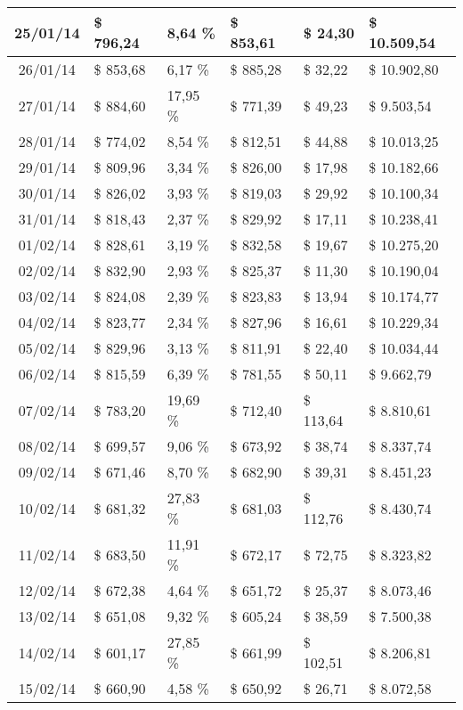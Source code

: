 \begin{small}
\begin{longtable}{|c|l|l|l|l|l|}
25/01/14 & \$ 796,24 & 8,64 \% & \$ 853,61 & \$ 24,30 & \$ 10.509,54 \\ \hline
26/01/14 & \$ 853,68 & 6,17 \% & \$ 885,28 & \$ 32,22 & \$ 10.902,80 \\ \hline
27/01/14 & \$ 884,60 & 17,95 \% & \$ 771,39 & \$ 49,23 & \$ 9.503,54 \\ \hline
28/01/14 & \$ 774,02 & 8,54 \% & \$ 812,51 & \$ 44,88 & \$ 10.013,25 \\ \hline
29/01/14 & \$ 809,96 & 3,34 \% & \$ 826,00 & \$ 17,98 & \$ 10.182,66 \\ \hline
30/01/14 & \$ 826,02 & 3,93 \% & \$ 819,03 & \$ 29,92 & \$ 10.100,34 \\ \hline
31/01/14 & \$ 818,43 & 2,37 \% & \$ 829,92 & \$ 17,11 & \$ 10.238,41 \\ \hline
01/02/14 & \$ 828,61 & 3,19 \% & \$ 832,58 & \$ 19,67 & \$ 10.275,20 \\ \hline
02/02/14 & \$ 832,90 & 2,93 \% & \$ 825,37 & \$ 11,30 & \$ 10.190,04 \\ \hline
03/02/14 & \$ 824,08 & 2,39 \% & \$ 823,83 & \$ 13,94 & \$ 10.174,77 \\ \hline
04/02/14 & \$ 823,77 & 2,34 \% & \$ 827,96 & \$ 16,61 & \$ 10.229,34 \\ \hline
05/02/14 & \$ 829,96 & 3,13 \% & \$ 811,91 & \$ 22,40 & \$ 10.034,44 \\ \hline
06/02/14 & \$ 815,59 & 6,39 \% & \$ 781,55 & \$ 50,11 & \$ 9.662,79 \\ \hline
07/02/14 & \$ 783,20 & 19,69 \% & \$ 712,40 & \$ 113,64 & \$ 8.810,61 \\ \hline
08/02/14 & \$ 699,57 & 9,06 \% & \$ 673,92 & \$ 38,74 & \$ 8.337,74 \\ \hline
09/02/14 & \$ 671,46 & 8,70 \% & \$ 682,90 & \$ 39,31 & \$ 8.451,23 \\ \hline
10/02/14 & \$ 681,32 & 27,83 \% & \$ 681,03 & \$ 112,76 & \$ 8.430,74 \\ \hline
11/02/14 & \$ 683,50 & 11,91 \% & \$ 672,17 & \$ 72,75 & \$ 8.323,82 \\ \hline
12/02/14 & \$ 672,38 & 4,64 \% & \$ 651,72 & \$ 25,37 & \$ 8.073,46 \\ \hline
13/02/14 & \$ 651,08 & 9,32 \% & \$ 605,24 & \$ 38,59 & \$ 7.500,38 \\ \hline
14/02/14 & \$ 601,17 & 27,85 \% & \$ 661,99 & \$ 102,51 & \$ 8.206,81 \\ \hline
15/02/14 & \$ 660,90 & 4,58 \% & \$ 650,92 & \$ 26,71 & \$ 8.072,58 \\ \hline

\end{longtable}
\end{small}
